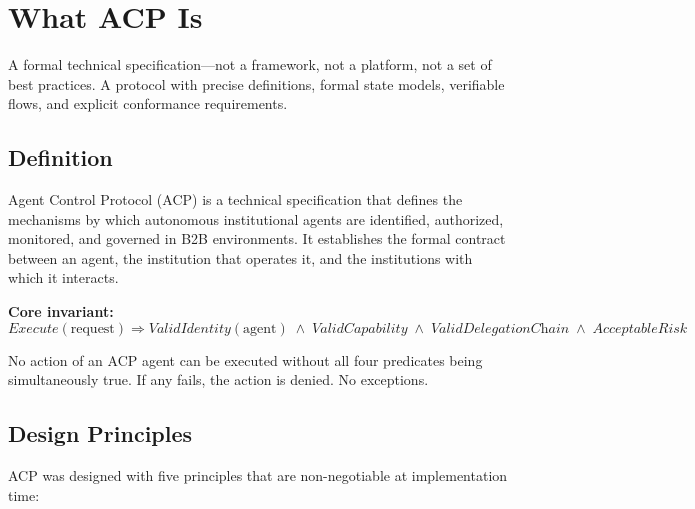 \documentclass[11pt]{article}
\theoremstyle{definition}
\begin{document}
\section{What ACP Is}

A formal technical specification---not a framework, not a platform, not a set of best practices.
A protocol with precise definitions, formal state models, verifiable flows, and explicit conformance requirements.

\subsection{Definition}

Agent Control Protocol (ACP) is a technical specification that defines the mechanisms by which autonomous institutional agents are identified, authorized, monitored, and governed in B2B environments.
It establishes the formal contract between an agent, the institution that operates it, and the institutions with which it interacts.

\textbf{Core invariant:}
\[
\textit{Execute}(\text{request}) \Longrightarrow
\textit{ValidIdentity}(\text{agent})
\;\wedge\; \textit{ValidCapability}
\;\wedge\; \textit{ValidDelegationChain}
\;\wedge\; \textit{AcceptableRisk}
\]

No action of an ACP agent can be executed without all four predicates being simultaneously true.
If any fails, the action is denied. No exceptions.

\subsection{Design Principles}

ACP was designed with five principles that are non-negotiable at implementation time:
\end{document}
